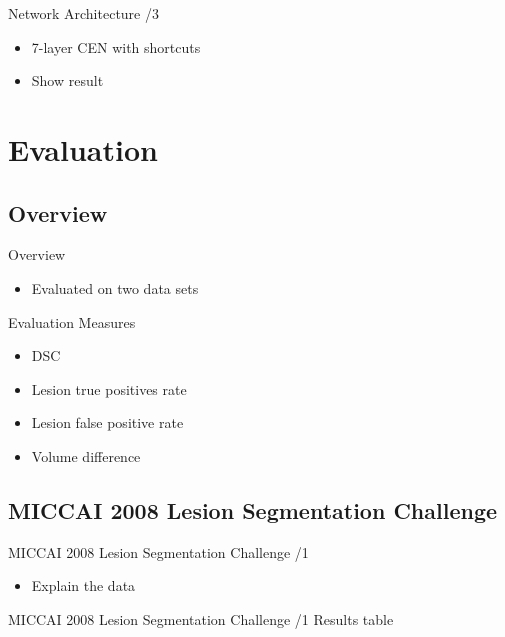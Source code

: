 \documentclass{beamer}
\begin{document}
\begin{frame}{Network Architecture /3}
\begin{itemize}
\item 7-layer CEN with shortcuts
\item Show result
\end{itemize}
\end{frame}

\section{Evaluation}

\subsection{Overview}

\begin{frame}{Overview}
\begin{itemize}
\item Evaluated on two data sets
\end{itemize}

\end{frame}

\begin{frame}{Evaluation Measures}
\begin{itemize}
\item DSC
\item Lesion true positives rate
\item Lesion false positive rate
\item Volume difference
\end{itemize}
\end{frame}

\subsection{MICCAI 2008 Lesion Segmentation Challenge}

\begin{frame}{MICCAI 2008 Lesion Segmentation Challenge /1}
\begin{itemize}
\item Explain the data
\end{itemize}
\end{frame}

\begin{frame}{MICCAI 2008 Lesion Segmentation Challenge /1}
Results table
\end{frame}
\end{document}
